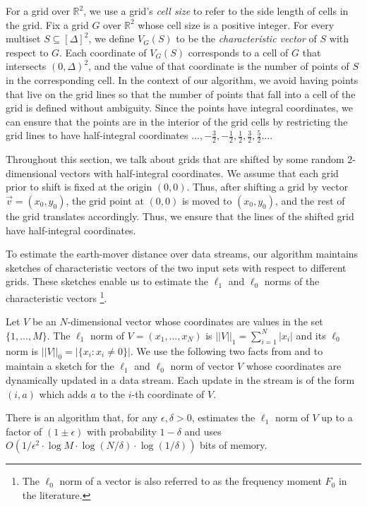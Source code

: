 \documentclass[oribibl]{llncs}
\begin{document}
For a grid over $\mathbb{R}^2$, we use a grid's \textit{cell size}
to refer to the side length of cells in the grid.
Fix a grid $G$
over $\mathbb{R}^2$ whose cell size is a positive integer. For every
multiset $S\subseteq[\Delta]^2$, we define $V_G(S)$ to be the
\textit{characteristic vector} of $S$ with respect to $G$. Each coordinate of
$V_G(S)$ corresponds to a cell of $G$ that intersects $(0,\Delta)^2$, and the
value of that coordinate is the number of points of $S$ in the corresponding 
cell.
In the context of our algorithm, we avoid having points that live on the grid 
lines so that the number of points that fall into a cell of the grid is
defined without ambiguity. Since the points have integral coordinates,
we can ensure that the points are in the interior of the grid cells
by restricting the grid lines to have
half-integral coordinates $\ldots,-\frac{3}{2}, -\frac{1}{2}, \frac{1}{2},
\frac{3}{2}, \frac{5}{2} \ldots$.

Throughout this section, we talk about grids that are shifted by some random
$2$-dimensional vectors with half-integral coordinates. 
We assume that each grid prior to shift is fixed at the origin $(0,0)$.
Thus, after shifting a grid by vector $\vec{v}=(x_0,y_0)$, the grid point
at $(0,0)$ is moved to $(x_0,y_0)$, and the rest of the grid translates
accordingly. Thus, we ensure that the lines of the shifted grid have
half-integral coordinates.

To estimate the earth-mover distance over data streams, our algorithm maintains
sketches of characteristic vectors of the two input sets
with respect to different grids. These sketches enable us to estimate
the $\ell_1$ and $\ell_0$ norms of the characteristic vectors
\footnote{The $\ell_0$ norm of a vector is
also referred to as the frequency moment $F_0$ in the literature.}. 

Let $V$ be an $N$-dimensional vector whose coordinates are values in the set
$\{1,\ldots ,M\}$. 
The $\ell_1$ norm of $V=(x_1,\ldots,x_N)$ is 
$||V||_1 = \sum_{i = 1}^N|x_i|$
and its $\ell_0$ norm is $||V||_0=|\{x_i: x_i\neq 0\}|$.
We use the following two facts from \cite{stable} and \cite{bar_yossef}
to maintain a sketch for the $\ell_1$ and $\ell_0$ norm of vector $V$ whose
coordinates are dynamically updated in a data stream. 
Each update in the stream is of the form $(i,a)$ which adds $a$ to the $i$-th
coordinate of $V$.

\begin{fact}\label{fact1}
There is an algorithm that, for any $\epsilon, \delta >0$, estimates the
$\ell_1$ norm of $V$ up to a factor of $(1\pm\epsilon)$ with probability
$1-\delta$ and uses $O(1/\epsilon^2\cdot\log M\cdot\log(N/\delta)\cdot\log(1/\delta))$
bits of memory.
\end{fact}
\end{document}
